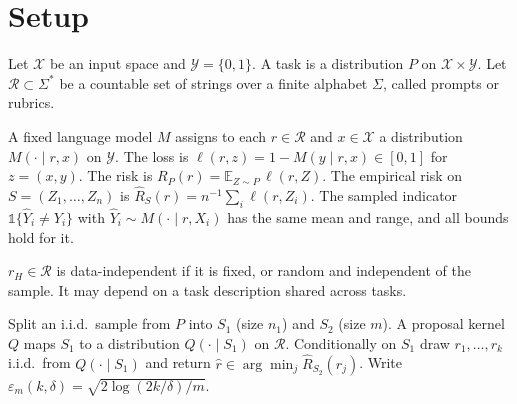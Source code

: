 \section{Setup}\label{sec:setup}

Let $\mathcal X$ be an input space and $\mathcal Y=\{0,1\}$.
A task is a distribution $P$ on $\mathcal X\times\mathcal Y$.
Let $\mathcal R\subset\Sigma^*$ be a countable set of strings over a finite alphabet $\Sigma$, called prompts or rubrics.

\begin{definition}\label{def:llm-classifier}
A fixed language model $M$ assigns to each $r\in\mathcal R$ and $x\in\mathcal X$ a distribution $M(\cdot\mid r,x)$ on $\mathcal Y$.
The loss is $\ell(r,z)=1-M(y\mid r,x)\in[0,1]$ for $z=(x,y)$.
The risk is $R_P(r)=\mathbb E_{Z\sim P}\,\ell(r,Z)$.
The empirical risk on $S=(Z_1,\dots,Z_n)$ is $\hat R_S(r)=n^{-1}\sum_i\ell(r,Z_i)$.
The sampled indicator $\mathbb 1\{\hat Y_i\neq Y_i\}$ with $\hat Y_i\sim M(\cdot\mid r,X_i)$ has the same mean and range, and all bounds hold for it.
\end{definition}

\begin{definition}\label{def:data-independent}
$r_H\in\mathcal R$ is data-independent if it is fixed, or random and independent of the sample.
It may depend on a task description shared across tasks.
\end{definition}

\begin{definition}\label{def:rubric-procedure}
Split an i.i.d.\ sample from $P$ into $S_1$ (size $n_1$) and $S_2$ (size $m$).
A proposal kernel $Q$ maps $S_1$ to a distribution $Q(\cdot\mid S_1)$ on $\mathcal R$.
Conditionally on $S_1$ draw $r_1,\dots,r_k$ i.i.d.\ from $Q(\cdot\mid S_1)$ and return $\hat r\in\arg\min_j\hat R_{S_2}(r_j)$.
Write $\varepsilon_m(k,\delta)=\sqrt{2\log(2k/\delta)/m}$.
\end{definition}
